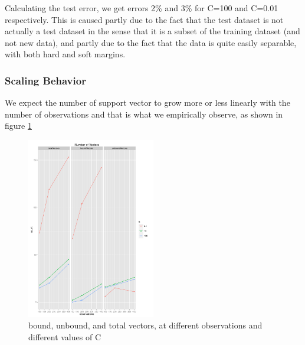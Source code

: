 \documentclass[11pt]{article}
\begin{document}
Calculating the test error, we get errors 2\% and 3\% for C=100 and C=0.01 respectively. This is caused partly due to the fact that the test dataset is not actually a test dataset in the sense that it is a subset of the training dataset (and not new data), and partly due to the fact that the data is quite easily separable, with both hard and soft margins. 

\newpage
\subsubsection{Scaling Behavior}
We expect the number of support vector to grow more or less linearly with the number of observations and that is what we empirically observe, as shown in figure \ref{SVectors}
\begin{figure}[h!]
  \centering
\includegraphics[width=0.5\textwidth]{SVectors}
\caption{bound, unbound, and total vectors, at different observations and different values of C}
\label{SVectors}
\end{figure}
\end{document}

